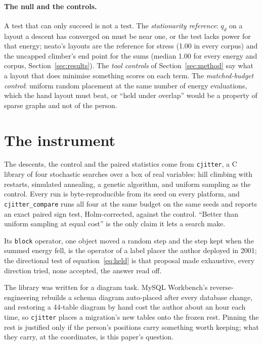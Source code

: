 \documentclass[a4paper,UKenglish]{gd-lipics-v3}
\begin{document}
\paragraph{The null and the controls.} A test that can only succeed is not a test. The
\emph{stationarity reference}: $q_d$ on a layout a descent has converged on must be near
one, or the test lacks power for that energy; neato's layouts are the reference for stress
(1.00 in every corpus) and the uncapped climber's end point for the sums (median 1.00 for
every energy and corpus, Section~\ref{sec:results}). The \emph{tool controls} of Section~\ref{sec:method} say what a layout that does
minimise something scores on each term. The \emph{matched-budget control}: uniform
random placement at the same number of energy evaluations, which the hand layout must beat,
or ``held under overlap'' would be a property of sparse graphs and not of the person.

\section{The instrument}\label{sec:instrument}

The descents, the control and the paired statistics come from \texttt{cjitter}, a C library
of four stochastic searches over a box of real variables: hill climbing with restarts,
simulated annealing, a genetic algorithm, and uniform sampling as the control. Every run is
byte-reproducible from its seed on every platform, and
\texttt{cjitter\_compare} runs all four at the same budget on the same seeds and
reports an exact paired sign test, Holm-corrected, against the control. ``Better than
uniform sampling at equal cost'' is the only claim it lets a search make.

Its \texttt{block} operator, one object moved a random step and the step kept when the
summed energy fell, is the operator of a label placer the author deployed in 2001; the
directional test of equation~\eqref{eq:held} is that proposal made exhaustive, every
direction tried, none accepted, the answer read off.

The library was written for a diagram task. MySQL Workbench's reverse-engineering
rebuilds a schema diagram auto-placed after every database change, and restoring a
44-table diagram by hand cost the author about an hour each time, so \texttt{cjitter}
places a migration's new tables onto the frozen rest. Pinning the rest is justified only
if the person's positions carry something worth keeping; what they carry, at the
coordinates, is this paper's question.
\end{document}
